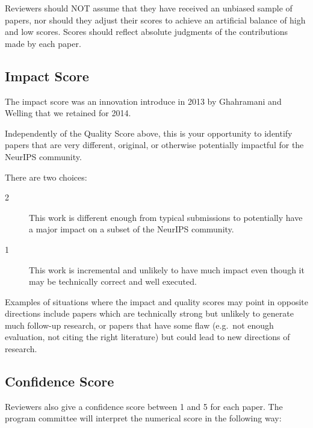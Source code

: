 Reviewers should NOT assume that they have received an unbiased sample
of papers, nor should they adjust their scores to achieve an artificial
balance of high and low scores. Scores should reflect absolute judgments
of the contributions made by each paper.

\subsection*{Impact Score}\label{impact-score}

The impact score was an innovation introduce in 2013 by Ghahramani and
Welling that we retained for 2014. 

Independently of the Quality Score above, this is your opportunity to
identify papers that are very different, original, or otherwise
potentially impactful for the NeurIPS community.

There are two choices:

\begin{description}
\item[2] This work is different enough from typical submissions to potentially
have a major impact on a subset of the NeurIPS community.

\item[1] This work is incremental and unlikely to have much impact even though
it may be technically correct and well executed.
\end{description}

Examples of situations where the impact and quality scores may point in
opposite directions include papers which are technically strong but
unlikely to generate much follow-up research, or papers that have some
flaw (e.g.~not enough evaluation, not citing the right literature) but
could lead to new directions of research.


\subsection*{Confidence Score}\label{confidence-score}

Reviewers also give a confidence score between 1 and 5 for each paper.
The program committee will interpret the numerical score in the
following way:

